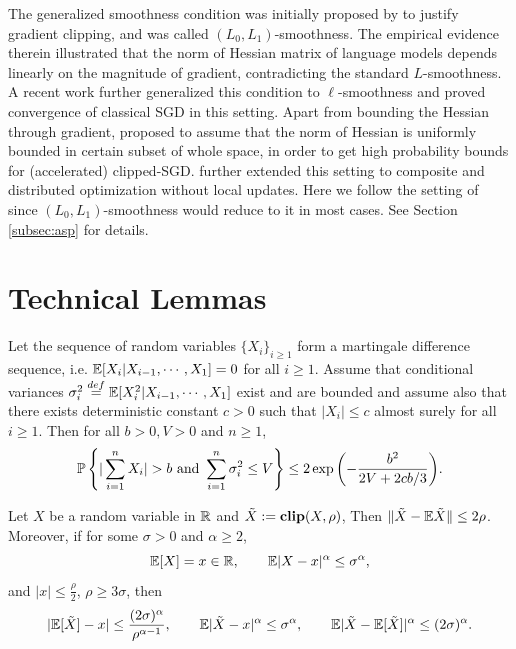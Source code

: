 \documentclass{article} %
\numberwithin{equation}{section}
\begin{document}
The generalized smoothness condition was initially proposed by \citep{zhang2019gradient} to justify gradient clipping, and was called $(L_0,L_1)$-smoothness. 
The empirical evidence therein illustrated that the norm of Hessian matrix of language models depends linearly on the magnitude of gradient, contradicting the standard $L$-smoothness.
A recent work \citep{li2024convex} further generalized this condition to $\ell$-smoothness and proved convergence of classical SGD in this setting.
Apart from bounding the Hessian through gradient, \cite{pmlr-v202-sadiev23a} proposed to assume that the norm of Hessian is uniformly bounded in certain subset of whole space, in order to get high probability bounds for (accelerated) clipped-SGD. 
\cite{gorbunov2023high} further extended this setting to composite and distributed optimization without local updates.
Here we follow the setting of \citep{pmlr-v202-sadiev23a} since $(L_0,L_1)$-smoothness would reduce to it in most cases. 
See Section \ref{subsec:asp} for details.

\section{Technical Lemmas}

\begin{lemma}\label{lem:martingale}
    Let the sequence of random variables $\{X_i\}_{i\geq 1}$ form a martingale difference sequence, i.e. $\mathbb{E} [X_i | X_{i-1}, \cdots, X_1] = 0$ for all $i\geq 1$. Assume that conditional variances $\sigma_i^2 \overset{def}{=} \mathbb{E} [X_i^2| X_{i-1},\cdots, X_1]$ exist and are bounded and assume also that there exists deterministic constant $c > 0$ such that $|X_i| \leq c$ almost surely for all $i \geq 1$. Then for all $b>0, V>0$ and $n \geq 1$,
    \begin{equation}
        \prob \left\{|\sum_{i=1}^{n}X_i|>b \text{ and } \sum_{i=1}^{n}\sigma_i^2\leq V\right\} \leq 2\exp{\left( -\frac{b^2}{2V+2cb/3}\right)}.
    \end{equation}
\end{lemma}

\begin{lemma}\label{lem:clip}
    Let $X$ be a random variable in $\mathbb{R}$ and $\Tilde{X}:=\textbf{clip}(X,\rho)$, Then $\|\Tilde{X}-\mathbb{E} \Tilde{X}\|\leq 2\rho$. 
    Moreover, if for some $\sigma>0$ and $\alpha \geq 2$, 
    \begin{equation}
        \mathbb{E} [X] = x\in \mathbb{R},\qquad \mathbb{E} |X-x|^\alpha \leq \sigma^\alpha, 
    \end{equation}
    and $|x|\leq \frac{\rho}{2}$, $\rho\geq 3\sigma$, then 
    \begin{equation}
        |\mathbb{E} [\Tilde{X}] - x| \leq \frac{(2\sigma)^{\alpha}}{\rho^{\alpha-1}},\qquad
        \mathbb{E} |\Tilde{X}-x|^\alpha \leq \sigma^\alpha,\qquad
        \mathbb{E} |\Tilde{X}-\mathbb{E} [\Tilde{X}]|^\alpha \leq (2\sigma)^\alpha.
    \end{equation}
\end{lemma}
\end{document}

